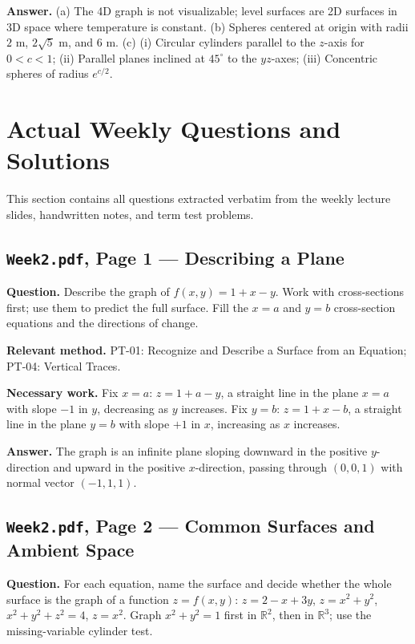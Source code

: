 \documentclass[11pt,letterpaper]{article}
\newcommand{\R}{\mathbb{R}}
\begin{document}
\textbf{Answer.}
(a) The 4D graph is not visualizable; level surfaces are 2D surfaces in 3D space where temperature is constant.
(b) Spheres centered at origin with radii $2$ m, $2\sqrt{5}$ m, and $6$ m.
(c) (i) Circular cylinders parallel to the $z$-axis for $0<c<1$; (ii) Parallel planes inclined at $45^\circ$ to the $yz$-axes; (iii) Concentric spheres of radius $e^{c/2}$.

\clearpage

\section{Actual Weekly Questions and Solutions}\label{sec:weekly-questions}
This section contains all questions extracted verbatim from the weekly lecture slides, handwritten notes, and term test problems.

\subsection{\texttt{Week2.pdf}, Page 1 --- Describing a Plane}
\textbf{Question.} Describe the graph of $f(x,y) = 1 + x - y$. Work with cross-sections first; use them to predict the full surface. Fill the $x=a$ and $y=b$ cross-section equations and the directions of change.

\textbf{Relevant method.} PT-01: Recognize and Describe a Surface from an Equation; PT-04: Vertical Traces.

\textbf{Necessary work.}
Fix $x=a$: $z = 1 + a - y$, a straight line in the plane $x=a$ with slope $-1$ in $y$, decreasing as $y$ increases.
Fix $y=b$: $z = 1 + x - b$, a straight line in the plane $y=b$ with slope $+1$ in $x$, increasing as $x$ increases.

\textbf{Answer.}
The graph is an infinite plane sloping downward in the positive $y$-direction and upward in the positive $x$-direction, passing through $(0,0,1)$ with normal vector $(-1, 1, 1)$.

\subsection{\texttt{Week2.pdf}, Page 2 --- Common Surfaces and Ambient Space}
\textbf{Question.} For each equation, name the surface and decide whether the whole surface is the graph of a function $z = f(x,y)$:
$z = 2 - x + 3y$, $z = x^2 + y^2$, $x^2 + y^2 + z^2 = 4$, $z = x^2$.
Graph $x^2 + y^2 = 1$ first in $\R^2$, then in $\R^3$; use the missing-variable cylinder test.
\end{document}

